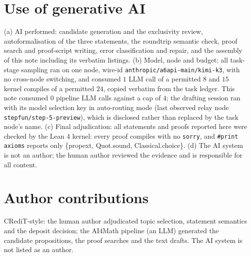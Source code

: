 \documentclass[11pt]{article}
\theoremstyle{definition}
\begin{document}
\section*{Use of generative AI}

(a) AI performed: candidate generation and the exclusivity review,
autoformalisation of the three statements, the roundtrip semantic check, proof
search and proof-script writing, error classification and repair, and the
assembly of this note including its verbatim listings. (b) Model, node and
budget: all task-stage sampling ran on one node, wire-id
\texttt{anthropic/a6api-main/kimi-k3}, with no cross-node switching, and
consumed $1$ LLM call of a permitted $8$ and $15$ kernel compiles of a
permitted $24$, copied verbatim from the task ledger. This note consumed $0$
pipeline LLM calls against a cap of $4$; the drafting session ran with its
model selection key in auto-routing mode (last observed relay node
\texttt{stepfun/step-5-preview}), which is disclosed rather than replaced by the
task node's name. (c) Final adjudication: all statements and proofs reported
here were checked by the Lean 4 kernel: every proof compiles with no
\texttt{sorry}, and \texttt{\#print axioms} reports only \{propext, Quot.sound,
Classical.choice\}. (d) The AI system is not an author; the human author
reviewed the evidence and is responsible for all content.

\section*{Author contributions}

CRediT-style: the human author adjudicated topic selection, statement semantics
and the deposit decision; the AI4Math pipeline (an LLM) generated the candidate
propositions, the proof searches and the text drafts. The AI system is not
listed as an author.
\end{document}
